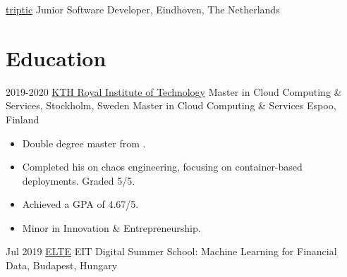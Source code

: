 { 
 {{\color{blue}\href{https://www.triptic.nl/}{triptic}}}
 {Junior Software Developer,}
 {Eindhoven, The Netherlands}
 {}{}
 {
 }
}


\section{Education}{
 
 \customcventry
 {2019-2020}
 {\color{blue}\href{https://kth.se/en}{KTH Royal Institute of Technology}}
 {Master in Cloud Computing \& Services,}
 {Stockholm, Sweden}
 {}{}{} %
 {\color{white}Master in Cloud Computing \& Services}
 {Espoo, Finland}{}{}
 {
 	\begin{itemize}[leftmargin=0.6cm, label={\textbullet}]
 		\item Double degree master from .
 		\item Completed his  on chaos engineering, focusing on container-based deployments. Graded 5/5.
 		\item Achieved a GPA of 4.67/5.
 		\item Minor in Innovation \& Entrepreneurship.
 	\end{itemize}
 }
 
 \customcventry
 {Jul 2019}
 {\color{blue}\href{https://www.elte.hu/en/}{ELTE}}
 {EIT Digital Summer School: Machine Learning for Financial Data,}
 {Budapest, Hungary}
 {}{}
 {
\vspace{2mm} %
 }
 
}

